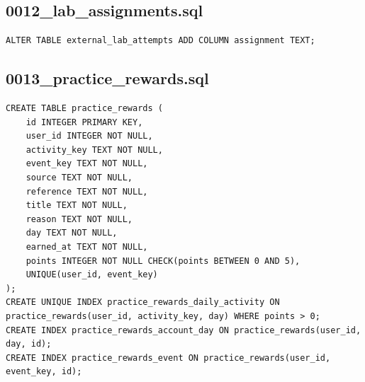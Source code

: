 \subsection{0012\_lab\_assignments.sql}
\begin{verbatim}
ALTER TABLE external_lab_attempts ADD COLUMN assignment TEXT;
\end{verbatim}
\subsection{0013\_practice\_rewards.sql}
\begin{verbatim}
CREATE TABLE practice_rewards (
    id INTEGER PRIMARY KEY,
    user_id INTEGER NOT NULL,
    activity_key TEXT NOT NULL,
    event_key TEXT NOT NULL,
    source TEXT NOT NULL,
    reference TEXT NOT NULL,
    title TEXT NOT NULL,
    reason TEXT NOT NULL,
    day TEXT NOT NULL,
    earned_at TEXT NOT NULL,
    points INTEGER NOT NULL CHECK(points BETWEEN 0 AND 5),
    UNIQUE(user_id, event_key)
);
CREATE UNIQUE INDEX practice_rewards_daily_activity ON practice_rewards(user_id, activity_key, day) WHERE points > 0;
CREATE INDEX practice_rewards_account_day ON practice_rewards(user_id, day, id);
CREATE INDEX practice_rewards_event ON practice_rewards(user_id, event_key, id);
\end{verbatim}
